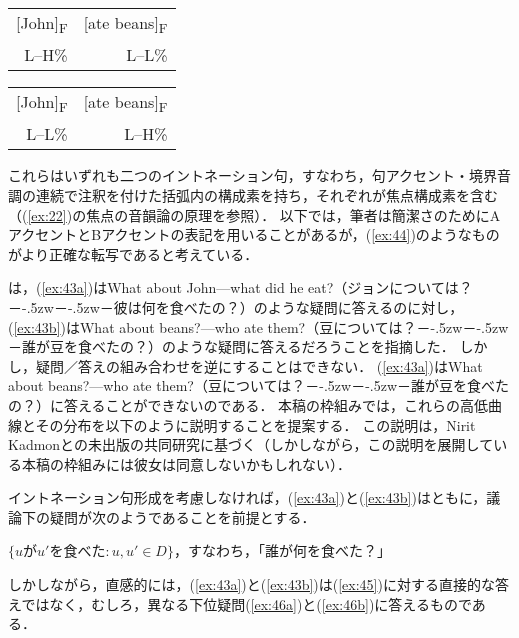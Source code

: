 \documentclass{goken}
\def\ddash{－\kern-.5zw－\kern-.5zw－}
\newcommand{\ori}[1]{\noindent\textcolor[gray]{0.7}{\fontsize{8pt}{8pt}\selectfont{\textsf{(p.~#1)}}} }
\begin{document}
\begin{exe}
	\ex\label{ex:44}
  \begin{xlist}
    \ex\label{ex:44a}
    \begin{tabular}[t]{r@{ }r}{}[John]\textsubscript{F} & [ate beans]\textsubscript{F}\\ %
    L--H\% & L--L\%\\\end{tabular}
    \ex\label{ex:44b}
    \begin{tabular}[t]{r@{ }r}{}[John]\textsubscript{F} & [ate beans]\textsubscript{F}\\ %
    L--L\% & L--H\%\\\end{tabular}
  \end{xlist}
\end{exe}

\noindent
これらはいずれも二つのイントネーション句，すなわち，句アクセント・境界音調の連続で注釈を付けた括弧内の構成素を持ち，それぞれが焦点構成素を含む（(\ref{ex:22})の焦点の音韻論の原理を参照）．
以下では，筆者は簡潔さのためにAアクセントとBアクセントの表記を用いることがあるが，(\ref{ex:44})のようなものがより正確な転写であると考えている．

\citeauthor{Jackendoff1972}は，(\ref{ex:43a})はWhat about John---what did he eat?（ジョンについては？\ddash{}彼は何を食べたの？）のような疑問に答えるのに対し，(\ref{ex:43b})はWhat about beans?---who ate them?（豆については？\ddash{}誰が豆を食べたの？）のような疑問に答えるだろうことを指摘した．
しかし，疑問／答えの組み合わせを逆にすることはできない．
(\ref{ex:43a})はWhat about beans?---who ate them?（豆については？\ddash{}誰が豆を食べたの？）に答えることができないのである．
\ori{48}
本稿の枠組みでは，これらの高低曲線とその分布を以下のように説明することを提案する．
この説明は，Nirit Kadmonとの未出版の共同研究に基づく（しかしながら，この説明を展開している本稿の枠組みには彼女は同意しないかもしれない）．

イントネーション句形成を考慮しなければ，(\ref{ex:43a})と(\ref{ex:43b})はともに，議論下の疑問が次のようであることを前提とする．

\begin{exe}
	\ex\label{ex:45} $\{u \text{が} u' \text{を食べた}: u, u' \in D\}$，すなわち，「誰が何を食べた？」
\end{exe}

\noindent
しかしながら，直感的には，(\ref{ex:43a})と(\ref{ex:43b})は(\ref{ex:45})に対する直接的な答えではなく，むしろ，異なる下位疑問(\ref{ex:46a})と(\ref{ex:46b})に答えるものである．
\end{document}
